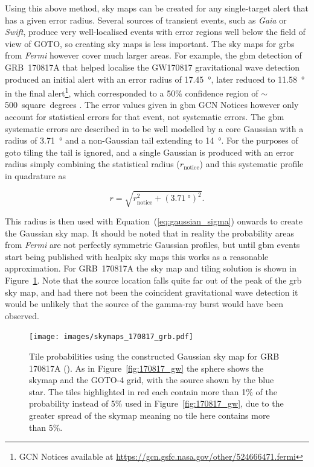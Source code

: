 \begin{colsection}
\begin{colsection}
Using this above method, sky maps can be created for any single-target alert that has a given error radius. Several sources of transient events, such as \textit{Gaia} or \textit{Swift}, produce very well-localised events with error regions well below the field of view of GOTO, so creating sky maps is less important. The sky maps for \glspl{grb} from \textit{Fermi} however cover much larger areas. For example, the \gls{gbm} detection of GRB~170817A that helped localise the GW170817 gravitational wave detection produced an initial alert with an error radius of \SI{17.45}{\degree}, later reduced to \SI{11.58}{\degree} in the final alert\footnote{GCN Notices available at \url{https://gcn.gsfc.nasa.gov/other/524666471.fermi}}, which corresponded to a 50\% confidence region of $\sim$500~square~degrees \citep{GW170817_Fermi}. The error values given in \gls{gbm} GCN Notices however only account for statistical errors for that event, not systematic errors. The \gls{gbm} systematic errors are described in \citet{Fermi_localisation} to be well modelled by a core Gaussian with a radius of \SI{3.71}{\degree} and a non-Gaussian tail extending to \SI{14}{\degree}. For the purposes of \gls{goto} tiling the tail is ignored, and a single Gaussian is produced with an error radius simply combining the statistical radius ($r_\text{notice}$) and this  systematic profile in quadrature as

\begin{equation}
    r = \sqrt{r_\text{notice}^2 + {(\SI{3.71}{\degree})}^2}.
    \label{eq:fermi_radius}
\end{equation}

This radius is then used with Equation~(\ref{eq:gaussian_sigma}) onwards to create the Gaussian sky map. It should be noted that in reality the probability areas from \textit{Fermi} are not perfectly symmetric Gaussian profiles, but until \gls{gbm} events start being published with \gls{healpix} sky maps this works as a reasonable approximation. For GRB~170817A the sky map and tiling solution is shown in Figure~\ref{fig:170817_grb}. Note that the source location falls quite far out of the peak of the \gls{grb} sky map, and had there not been the coincident gravitational wave detection it would be unlikely that the source of the gamma-ray burst would have been observed.

\begin{figure}[p]
\begin{center}
\texttt{[image: images/skymaps\_170817\_grb.pdf]}
\end{center}
\caption[Tile probabilities for GRB 170817A]{Tile probabilities using the constructed Gaussian sky map for GRB 170817A (\cite{GW170817_Fermi}). As in Figure~\ref{fig:170817_gw} the sphere shows the skymap and the GOTO-4 grid, with the source shown by the blue star. The tiles highlighted in red each contain more than 1\% of the probability instead of 5\% used in Figure~\ref{fig:170817_gw}, due to the greater spread of the skymap meaning no tile here contains more than 5\%.\\
}
\label{fig:170817_grb}
\end{figure}


\end{colsection}
\end{colsection}
